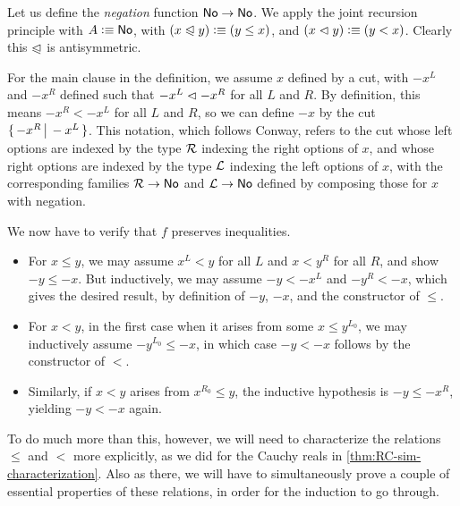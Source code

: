 \begin{eg}
  Let us define the \emph{negation} function $\mathsf{No}\to\mathsf{No}$.
  We apply the joint recursion principle with $A\vcentcolon\equiv\mathsf{No}$, with $(x\trianglelefteqslant y)\vcentcolon\equiv (y\le x)$, and $(x\vartriangleleft y)\vcentcolon\equiv (y< x)$.
  Clearly this $\trianglelefteqslant$ is antisymmetric.

  For the main clause in the definition, we assume $x$ defined by a cut, with $-x^L$ and $-x^R$ defined such that $-x^L \vartriangleleft -x^R$ for all $L$ and $R$.
  By definition, this means $-x^R< -x^L$ for all $L$ and $R$, so we can define $-x$ by the cut $\{\,-x^R\,\big|\,-x^L\,\}$.
  This notation, which follows Conway, refers to the cut whose left options are indexed by the type $\mathcal{R}$ indexing the right options of $x$, and whose right options are indexed by the type $\mathcal{L}$ indexing the left options of $x$, with the corresponding families $\mathcal{R}\to\mathsf{No}$ and $\mathcal{L}\to\mathsf{No}$ defined by composing those for $x$ with negation.

  We now have to verify that $f$ preserves inequalities.
  \begin{itemize}
  \item For $x\le y$, we may assume $x^L<y$ for all $L$ and $x < y^R$ for all $R$, and show $-y\le -x$.
    But inductively, we may assume $-y <-x^L$ and $-y^R<-x$, which gives the desired result, by definition of $-y$, $-x$, and the constructor of $\le$.
  \item For $x<y$, in the first case when it arises from some $x\le y^{L_0}$, we may inductively assume $-y^{L_0} \le -x$, in which case $-y<-x$ follows by the constructor of $<$.
  \item Similarly, if $x<y$ arises from $x^{R_0}\le y$, the inductive hypothesis is $-y \le -x^R$, yielding $-y<-x$ again.
  \end{itemize}
\end{eg}

To do much more than this, however, we will need to characterize the relations $\le$ and $<$ more explicitly, as we did for the Cauchy reals in \autoref{thm:RC-sim-characterization}.
Also as there, we will have to simultaneously prove a couple of essential properties of these relations, in order for the induction to go through.

